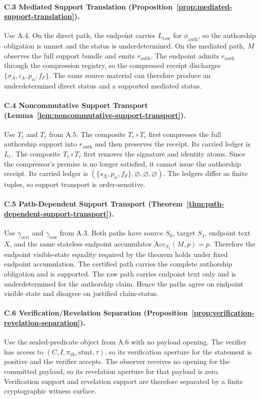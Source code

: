 \documentclass[11pt,twoside]{article}
\theoremstyle{definition}
\newcommand{\Acc}{\mathrm{Acc}}
\newcommand{\underdetermined}{\mathrm{underdetermined}}
\begin{document}
\paragraph{C.3 Mediated Support Translation (Proposition~\ref{prop:mediated-support-translation}).}
Use A.4. On the direct path, the endpoint carries $L_{\mathrm{raw}}$ for
$\phi_{\mathrm{auth}}$, so the authorship obligation is unmet and the status is
$\underdetermined$. On the mediated path, $M$ observes the full support bundle
and emits $r_{\mathrm{auth}}$. The endpoint admits $r_{\mathrm{auth}}$ through
the compression registry, so the compressed receipt discharges
$\{\sigma_A,i_A,p_\alpha,f_F\}$. The same source material can therefore produce
an underdetermined direct status and a supported mediated status.

\paragraph{C.4 Noncommutative Support Transport (Lemma~\ref{lem:noncommutative-support-transport}).}
Use $T_c$ and $T_r$ from A.5. The composite $T_r\circ T_c$ first compresses the
full authorship support into $r_{\mathrm{auth}}$ and then preserves the receipt.
Its carried ledger is $L_c$. The composite $T_c\circ T_r$
first removes the signature and identity atoms. Since the compressor's premise
is no longer satisfied, it cannot issue the authorship receipt. Its carried
ledger is $(\{s_X,p_\alpha,f_F\},\varnothing,\varnothing,\varnothing)$. The
ledgers differ as finite tuples, so support transport is order-sensitive.

\paragraph{C.5 Path-Dependent Support Transport (Theorem~\ref{thm:path-dependent-support-transport}).}
Use $\gamma_{\mathrm{cert}}$ and $\gamma_{\mathrm{raw}}$ from A.3. Both paths
have source $S_0$, target $S_1$, endpoint text $X$, and the same stateless
endpoint accumulator $\Acc_{S_1}(M,p)=p$. Therefore the endpoint visible-state
equality required by the theorem holds under fixed endpoint accumulation. The
certified path carries the complete authorship obligation and is supported. The
raw path carries endpoint text only and is underdetermined for the authorship
claim. Hence the paths agree on endpoint visible state and disagree on
justified claim-status.

\paragraph{C.6 Verification/Revelation Separation (Proposition~\ref{prop:verification-revelation-separation}).}
Use the sealed-predicate object from A.6 with no payload opening. The verifier
has access to $(C,I,\pi_{\mathrm{zk}},\mathrm{stmt},\tau)$, so its verification
aperture for the statement is positive and the verifier accepts. The observer
receives no opening for the committed payload, so its revelation aperture for
that payload is zero. Verification support and revelation support are therefore
separated by a finite cryptographic witness surface.
\end{document}
